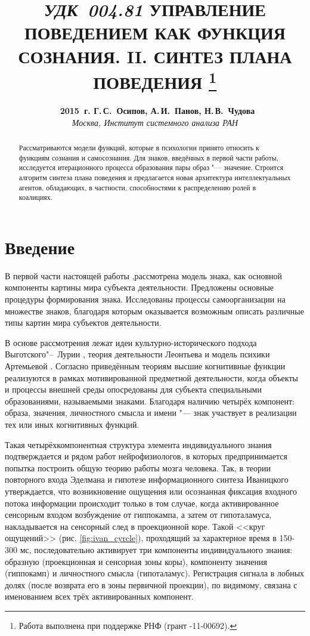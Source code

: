 \documentclass[a4paper, 12pt]{article}
\title{
	\hbox{\normalsize\textit{УДК 004.81}}
	\hbox{}\textbf{\Large\MakeUppercase{Управление поведением как функция сознания. II. Синтез плана поведения}}
	\footnote{Работа выполнена при поддержке РНФ (грант \textnumero 14-11-00692).}
}
\author{
	\textbf{\textcopyright~2015~г. Г.\,С.~Осипов, А.\,И.~Панов, Н.\,В.~Чудова}\\
	\normalsize\textit{Москва, Институт системного анализа РАН}
}
\date{}
\theoremstyle{plain}
\begin{document}
	\vspace*{-5\baselineskip}			%
	{\let\newpage\relax\maketitle}
	
	\begin{abstract}
		\noindent Рассматриваются модели функций, которые в психологии принято относить к функциям сознания и самосознания. Для знаков, введённых в первой части работы, исследуется итерационного процесса образования пары образ "--- значение. Строится алгоритм синтеза плана поведения и предлагается новая архитектура интеллектуальных агентов, обладающих, в частности, способностями к распределению ролей в коалициях.
	\end{abstract}	
	
	\section*{Введение}
	В первой части настоящей работы \cite{PanovA2014a},рассмотрена модель знака, как основной компоненты картины мира субъекта деятельности. Предложены основные процедуры формирования знака. Исследованы процессы самоорганизации на множестве знаков, благодаря которым оказывается возможным описать различные типы картин мира субъектов деятельности.
	
	В основе рассмотрения лежат идеи культурно-исторического подхода Выготского"--~Лурии \cite{Luria1970,Vygotsky2005}, теория деятельности Леонтьева \cite{Leontiev1975} и модель психики Артемьевой \cite{Artemyeva1980}. Согласно приведённым теориям высшие когнитивные функции реализуются в рамках мотивированной предметной деятельности, когда объекты и процессы внешней  среды опосредованы для субъекта специальными образованиями, называемыми знаками. Благодаря наличию четырёх компонент: образа, значения, личностного смысла и имени "--- знак участвует в реализации тех или иных когнитивных функций. 
	
	Такая четырёхкомпонентная структура элемента индивидуального знания подтверждается и рядом работ нейрофизиологов, в которых предпринимается попытка построить общую теорию работы мозга человека. Так, в теории повторного входа Эделмана \cite{Edelmen1981} и гипотезе информационного синтеза Иваницкого \cite{Ivanitsky1996,Ivanitsky2010} утверждается, что возникновение ощущения или осознанная фиксация входного потока информации происходит только в том случае, когда активированное сенсорным входом возбуждение от гиппокампа, а затем от гипоталамуса, накладывается на сенсорный след в проекционной коре. Такой <<круг ощущений>> (рис. \ref{fig:ivan_cyrcle}), проходящий за характерное время в 150-300 мс, последовательно активирует три компоненты индивидуального знания: образную (проекционная и сенсорная зоны коры), компоненту значения (гиппокамп) и личностного смысла (гипоталамус). Регистрация сигнала в лобных долях (после возврата его в зоны первичной проекции), по видимому, связана с именованием всех трёх активированных компонент.
	
\end{document}
